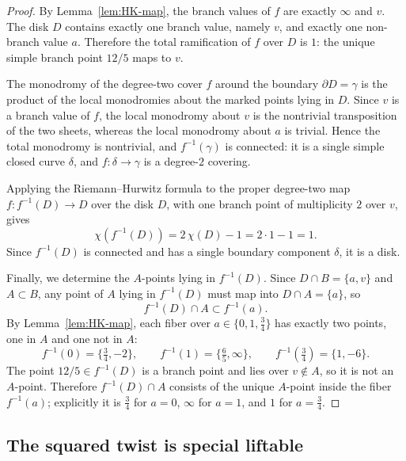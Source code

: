 \documentclass[12pt]{article}
\theoremstyle{definition}
\theoremstyle{remark}
\numberwithin{equation}{section}
\begin{document}
\begin{proof}
By Lemma~\ref{lem:HK-map}, the branch values of $f$ are exactly
$\infty$ and $v$.  The disk $D$ contains exactly one branch value,
namely $v$, and exactly one non-branch value $a$.  Therefore the total
ramification of $f$ over $D$ is $1$: the unique simple branch point
$12/5$ maps to $v$.

The monodromy of the degree-two cover $f$ around the boundary
$\partial D=\gamma$ is the product of the local monodromies about the
marked points lying in $D$.  Since $v$ is a branch value of $f$, the
local monodromy about $v$ is the nontrivial transposition of the two
sheets, whereas the local monodromy about $a$ is trivial.  Hence the
total monodromy is nontrivial, and $f^{-1}(\gamma)$ is connected: it is
a single simple closed curve $\delta$, and $f:\delta\to\gamma$ is a
degree-$2$ covering.

Applying the Riemann--Hurwitz formula to the proper degree-two map
$f:f^{-1}(D)\to D$ over the disk $D$, with one branch point of
multiplicity $2$ over $v$, gives
\[
\chi\!\left(f^{-1}(D)\right)=2\,\chi(D)-1=2\cdot1-1=1.
\]
Since $f^{-1}(D)$ is connected and has a single boundary component
$\delta$, it is a disk.

Finally, we determine the $A$-points lying in $f^{-1}(D)$.  Since
$D\cap B=\{a,v\}$ and $A\subset B$, any point of $A$ lying in
$f^{-1}(D)$ must map into $D\cap A=\{a\}$, so
\[
f^{-1}(D)\cap A\subset f^{-1}(a).
\]
By Lemma~\ref{lem:HK-map}, each fiber over $a\in\{0,1,\tfrac34\}$ has
exactly two points, one in $A$ and one not in $A$:
\[
f^{-1}(0)=\{\tfrac34,-2\},\qquad
f^{-1}(1)=\{\tfrac65,\infty\},\qquad
f^{-1}(\tfrac34)=\{1,-6\}.
\]
The point $12/5\in f^{-1}(D)$ is a branch point and lies over
$v\notin A$, so it is not an $A$-point.  Therefore
$f^{-1}(D)\cap A$ consists of the unique $A$-point inside the fiber
$f^{-1}(a)$; explicitly it is $\tfrac34$ for $a=0$, $\infty$ for
$a=1$, and $1$ for $a=\tfrac34$.
\end{proof}

\subsection{The squared twist is special liftable}
\end{document}
